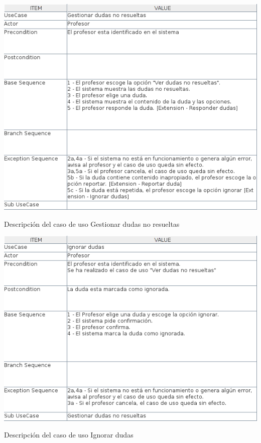 \documentclass[openright,twoside,10pt]{book}
\begin{document}
    \vspace*{\fill}
    
    \newpage
    
    \vspace*{\fill}
    
    \begin{table}[H]
        \begin{center}
            \includegraphics[width=\textwidth]{img/astah/analisis/casos_de_uso/useCase08.png}
        \end{center}
        \caption{Descripción del caso de uso Gestionar dudas no resueltas}
    \end{table}
    
    \vspace*{\fill}
    
    \newpage
    
    \vspace*{\fill}
    
    \begin{table}[H]
        \begin{center}
            \includegraphics[width=\textwidth]{img/astah/analisis/casos_de_uso/useCase09.png}
        \end{center}
        \caption{Descripción del caso de uso Ignorar dudas}
    \end{table}
    
\end{document}
